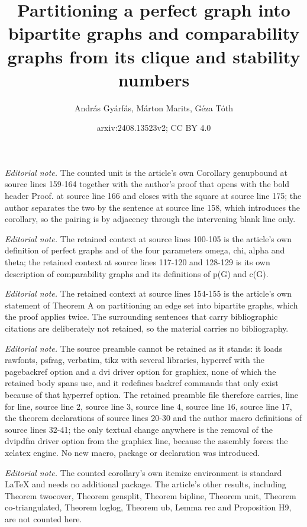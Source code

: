 \documentclass[12pt]{article}
\title{Partitioning a perfect graph into bipartite graphs and comparability graphs from its clique and stability numbers}
\author{András Gyárfás, Márton Marits, Géza Tóth}
\date{arxiv:2408.13523v2; CC BY 4.0}
\begin{document}
\maketitle
\noindent\textit{Editorial note.} The counted unit is the article's own Corollary genupbound at source lines 159-164 together with the author's proof that opens with the bold header Proof. at source line 166 and closes with the square at source line 175; the author separates the two by the sentence at source line 158, which introduces the corollary, so the pairing is by adjacency through the intervening blank line only.\par\medskip
\noindent\textit{Editorial note.} The retained context at source lines 100-105 is the article's own definition of perfect graphs and of the four parameters omega, chi, alpha and theta; the retained context at source lines 117-120 and 128-129 is its own description of comparability graphs and its definitions of p(G) and c(G).\par\medskip
\noindent\textit{Editorial note.} The retained context at source lines 154-155 is the article's own statement of Theorem A on partitioning an edge set into bipartite graphs, which the proof applies twice. The surrounding sentences that carry bibliographic citations are deliberately not retained, so the material carries no bibliography.\par\medskip
\noindent\textit{Editorial note.} The source preamble cannot be retained as it stands: it loads rawfonts, psfrag, verbatim, tikz with several libraries, hyperref with the pagebackref option and a dvi driver option for graphicx, none of which the retained body spans use, and it redefines backref commands that only exist because of that hyperref option. The retained preamble file therefore carries, line for line, source line 2, source line 3, source line 4, source line 16, source line 17, the theorem declarations of source lines 20-30 and the author macro definitions of source lines 32-41; the only textual change anywhere is the removal of the dvipdfm driver option from the graphicx line, because the assembly forces the xelatex engine. No new macro, package or declaration was introduced.\par\medskip
\noindent\textit{Editorial note.} The counted corollary's own itemize environment is standard LaTeX and needs no additional package. The article's other results, including Theorem twocover, Theorem gensplit, Theorem bipline, Theorem unit, Theorem co-triangulated, Theorem loglog, Theorem ub, Lemma rec and Proposition H9, are not counted here.\par\medskip
\end{document}
